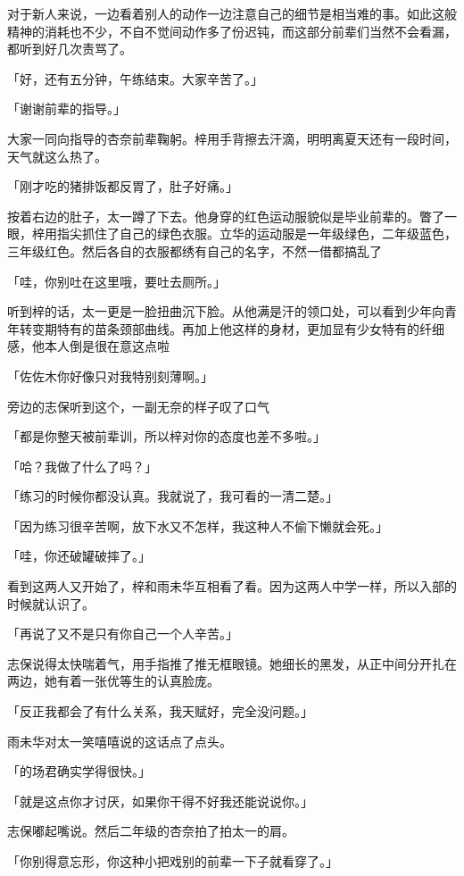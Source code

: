 \documentclass[UTF8]{ctexart}
\begin{document}
    对于新人来说，一边看着别人的动作一边注意自己的细节是相当难的事。如此这般精神的消耗也不少，不自不觉间动作多了份迟钝，而这部分前辈们当然不会看漏，都听到好几次责骂了。

    「好，还有五分钟，午练结束。大家辛苦了。」

    「谢谢前辈的指导。」

    大家一同向指导的杏奈前辈鞠躬。梓用手背擦去汗滴，明明离夏天还有一段时间，天气就这么热了。

    「刚才吃的猪排饭都反胃了，肚子好痛。」

    按着右边的肚子，太一蹲了下去。他身穿的红色运动服貌似是毕业前辈的。瞥了一眼，梓用指尖抓住了自己的绿色衣服。立华的运动服是一年级绿色，二年级蓝色，三年级红色。然后各自的衣服都绣有自己的名字，不然一借都搞乱了

    「哇，你别吐在这里哦，要吐去厕所。」

    听到梓的话，太一更是一脸扭曲沉下脸。从他满是汗的领口处，可以看到少年向青年转变期特有的苗条颈部曲线。再加上他这样的身材，更加显有少女特有的纤细感，他本人倒是很在意这点啦

    「佐佐木你好像只对我特别刻薄啊。」

    旁边的志保听到这个，一副无奈的样子叹了口气

    「都是你整天被前辈训，所以梓对你的态度也差不多啦。」

    「哈？我做了什么了吗？」

    「练习的时候你都没认真。我就说了，我可看的一清二楚。」

    「因为练习很辛苦啊，放下水又不怎样，我这种人不偷下懒就会死。」

    「哇，你还破罐破摔了。」

    看到这两人又开始了，梓和雨未华互相看了看。因为这两人中学一样，所以入部的时候就认识了。

    「再说了又不是只有你自己一个人辛苦。」

    志保说得太快喘着气，用手指推了推无框眼镜。她细长的黑发，从正中间分开扎在两边，她有着一张优等生的认真脸庞。

    「反正我都会了有什么关系，我天赋好，完全没问题。」

    雨未华对太一笑嘻嘻说的这话点了点头。

    「的场君确实学得很快。」

    「就是这点你才讨厌，如果你干得不好我还能说说你。」

    志保嘟起嘴说。然后二年级的杏奈拍了拍太一的肩。

    「你别得意忘形，你这种小把戏别的前辈一下子就看穿了。」
\end{document}
